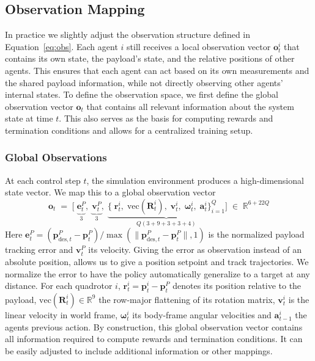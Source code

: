 \subsection{Observation Mapping}
In practice we slightly adjust the observation structure defined in Equation~\eqref{eq:obs}. Each agent \(i\) still receives a local observation vector \(\mathbf{o}^i_t\) that contains its own state, the payload's state, and the relative positions of other agents.  This ensures that each agent can act based on its own measurements and the shared payload information, while not directly observing other agents' internal states. To define the observation space, we first define the global observation vector \(\mathbf{o}_t\) that contains all relevant information about the system state at time \(t\). This also serves as the basis for computing rewards and termination conditions and allows for a centralized training setup.
\subsubsection{Global Observations}
At each control step \(t\), the simulation environment produces a high-dimensional state vector. We map this to a global observation vector 
\begin{equation}
\mathbf{o}_t \;=\; \bigl[\;\underbrace{\mathbf{e}^P_t}_{3},\;\underbrace{\mathbf{v}^P_t}_{3},\;\underbrace{\{\;\mathbf{r}^i_t,\;\mathrm{vec}(\mathbf{R}^i_t),\;\mathbf{v}^i_t,\;\boldsymbol{\omega}^i_t,\;\mathbf{a}^i_t\}_{i=1}^Q}_{Q(3+9+3+3+4)}\bigr] \;\in\;\mathbb{R}^{6 + 22Q}
\end{equation}
Here \(\mathbf{e}^P_t = (\mathbf{p}^P_{\mathrm{des},t}-\mathbf{p}^P_t)/\max(\|\mathbf{p}^P_{\mathrm{des},t}-\mathbf{p}^P_t\|,1)\) is the normalized payload tracking error and \(\mathbf{v}^P_t\) its velocity. Giving the error as observation instead of an absolute position, allows us to give a position setpoint and track trajectories. We normalize the error to have the policy automatically generalize to a target at any distance. For each quadrotor \(i\), \(\mathbf{r}^i_t=\mathbf{p}^i_t-\mathbf{p}^P_t\) denotes its position relative to the payload, \(\mathrm{vec}(\mathbf{R}^i_t)\in\mathbb{R}^9\) the row-major flattening of its rotation matrix, \(\mathbf{v}^i_t\) is the linear velocity in world frame, \(\boldsymbol{\omega}^i_t\) its body-frame angular velocities and \(\mathbf{a}^i_{t-1}\) the agents previous action. By construction, this global observation vector contains all information required to compute rewards and termination conditions. It can be easily adjusted to include additional information or other mappings.

